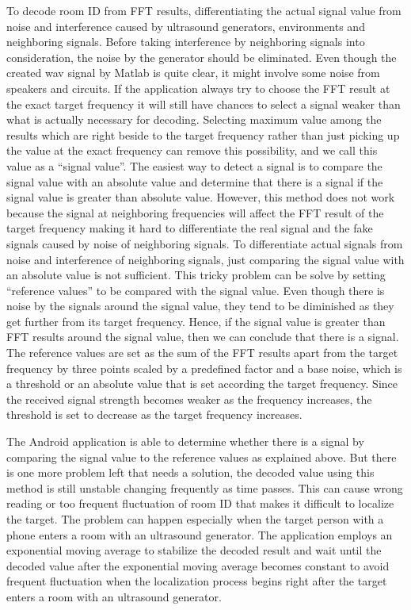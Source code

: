 To decode room ID from FFT results, differentiating the actual signal value from noise and interference caused by ultrasound generators, environments and neighboring signals. Before taking interference by neighboring signals into consideration, the noise by the generator should be eliminated. Even though the created wav signal by Matlab is quite clear, it might involve some noise from speakers and circuits. If the application always try to choose the FFT result at the exact target frequency it will still have chances to select a signal weaker than what is actually necessary for decoding. Selecting maximum value among the results which are right beside to the target frequency rather than just picking up the value at the exact frequency can remove this possibility, and we call this value as a “signal value”. The easiest way to detect a signal is to compare the signal value with an absolute value and determine that there is a signal if the signal value is greater than absolute value. However, this method does not work because the signal at neighboring frequencies will affect the FFT result of the target frequency making it hard to differentiate the real signal and the fake signals caused by noise of neighboring signals. To differentiate actual signals from noise and interference of neighboring signals, just comparing the signal value with an absolute value is not sufficient. This tricky problem can be solve by setting “reference values” to be compared with the signal value. Even though there is noise by the signals around the signal value, they tend to be diminished as they get further from its target frequency. Hence, if the signal value is greater than FFT results around the signal value, then we can conclude that there is a signal. The reference values are set as the sum of the FFT results apart from the target frequency by three points scaled by a predefined factor and a base noise, which is a threshold or an absolute value that is set according the target frequency. Since the received signal strength becomes weaker as the frequency increases, the threshold is set to decrease as the target frequency increases.

The Android application is able to determine whether there is a signal by comparing the signal value to the reference values as explained above. But there is one more problem left that needs a solution, the decoded value using this method is still unstable changing frequently as time passes. This can cause wrong reading or too frequent fluctuation of room ID that makes it difficult to localize the target.  The problem can happen especially when the target person with a phone enters a room with an ultrasound generator. The application employs an exponential moving average to stabilize the decoded result and wait until the decoded value after the exponential moving average becomes constant to avoid frequent fluctuation when the localization process begins right after the target enters a room with an ultrasound generator.

